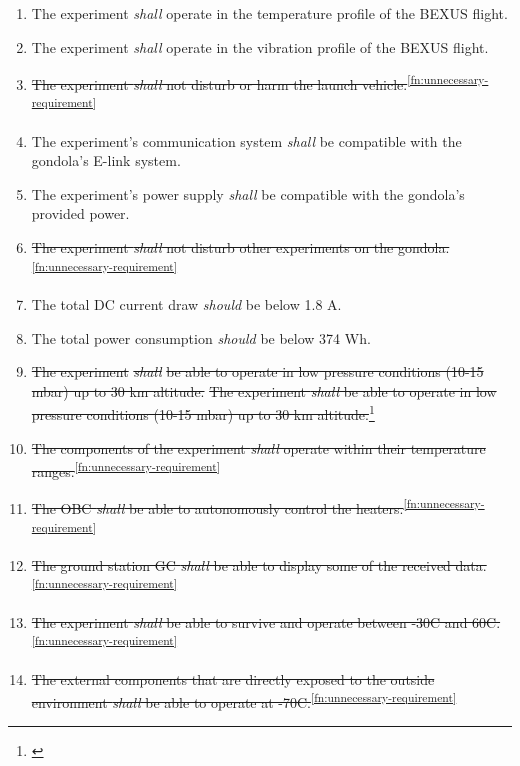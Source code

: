 \documentclass[a4paper,12pt,twoside, final]{article}
\providecommand{\DIFaddtex}[1]{{\protect\color{blue}\uwave{#1}}} %
\providecommand{\DIFdeltex}[1]{{\protect\color{red}\sout{#1}}}                      %
\providecommand{\DIFaddbegin}{} %
\providecommand{\DIFaddend}{} %
\providecommand{\DIFdelbegin}{} %
\providecommand{\DIFdelend}{} %
\providecommand{\DIFadd}[1]{\texorpdfstring{\DIFaddtex{#1}}{#1}} %
\providecommand{\DIFdel}[1]{\texorpdfstring{\DIFdeltex{#1}}{}} %
\newcommand{\DIFscaledelfig}{0.5}
\newlength{\DIFdelgraphicswidth} %
\newlength{\DIFdelgraphicsheight} %
\newcommand{\DIFaddincludegraphics}[2][]{{\color{blue}\fbox{\DIFOincludegraphics[#1]{#2}}}} %
\newcommand{\DIFdelincludegraphics}[2][]{%
\sbox{\DIFdelgraphicsbox}{\DIFOincludegraphics[#1]{#2}}%
\settoboxwidth{\DIFdelgraphicswidth}{\DIFdelgraphicsbox} %
\settoboxtotalheight{\DIFdelgraphicsheight}{\DIFdelgraphicsbox} %
\scalebox{\DIFscaledelfig}{%
\parbox[b]{\DIFdelgraphicswidth}{\usebox{\DIFdelgraphicsbox}\\[-\baselineskip] \rule{\DIFdelgraphicswidth}{0em}}\llap{\resizebox{\DIFdelgraphicswidth}{\DIFdelgraphicsheight}{%
\setlength{\unitlength}{\DIFdelgraphicswidth}%
\begin{picture}(1,1)%
\thicklines\linethickness{2pt} %
{\color[rgb]{1,0,0}\put(0,0){\framebox(1,1){}}}%
{\color[rgb]{1,0,0}\put(0,0){\line( 1,1){1}}}%
{\color[rgb]{1,0,0}\put(0,1){\line(1,-1){1}}}%
\end{picture}%
}\hspace*{3pt}}} %
} %
\DeclareRobustCommand{\DIFaddbegin}{\DIFOaddbegin \let\includegraphics\DIFaddincludegraphics} %
\DeclareRobustCommand{\DIFaddend}{\DIFOaddend \let\includegraphics\DIFOincludegraphics} %
\DeclareRobustCommand{\DIFdelbegin}{\DIFOdelbegin \let\includegraphics\DIFdelincludegraphics} %
\DeclareRobustCommand{\DIFdelend}{\DIFOaddend \let\includegraphics\DIFOincludegraphics} %
\begin{document}
\begin{enumerate}[label=D.\arabic*]
    \item The experiment \textit{shall} operate in the temperature profile of the BEXUS flight.
    \item The experiment \textit{shall} operate in the vibration profile of the BEXUS flight.
    \item \st{The experiment \textit{shall} not disturb or harm the launch vehicle.}\textsuperscript{\ref{fn:unnecessary-requirement}}
    \item The experiment's communication system \textit{shall} be compatible with the gondola's E-link system.
    \item The experiment's power supply \textit{shall} be compatible with the gondola's provided power.
    \item \st{The experiment \textit{shall} not disturb other experiments on the gondola.}\textsuperscript{\ref{fn:unnecessary-requirement}}
    \item The total DC current draw \textit{should} be below 1.8 A.
    \item The total power consumption \textit{should} be below 374 Wh.
    \item \DIFdelbegin \DIFdel{The experiment }\textit{\DIFdel{shall}} %
\DIFdel{be able to operate in low pressure conditions (10-15 mbar) up to 30 km altitude.
    }\DIFdelend \DIFaddbegin \st{The experiment \textit{shall} be able to operate in low pressure conditions (10-15 mbar) up to 30 km altitude.}\footnote{\DIFadd{Repeated in D18}\label{fn:repeat-d18}}
    \DIFaddend \item \st{The components of the experiment \textit{shall} operate within their temperature ranges.}\textsuperscript{\ref{fn:unnecessary-requirement}}
    \item \st{The OBC \textit{shall} be able to autonomously control the heaters.}\textsuperscript{\ref{fn:unnecessary-requirement}}
    \item \st{The ground station GC \textit{shall} be able to display some of the received data.}\textsuperscript{\ref{fn:unnecessary-requirement}}
    \item \st{The experiment \textit{shall} be able to survive and operate between -30\degree C and 60\degree C.}\textsuperscript{\ref{fn:unnecessary-requirement}}
    \item \st{The external components that are directly exposed to the outside environment \textit{shall} be able to operate at -70\degree C.}\textsuperscript{\ref{fn:unnecessary-requirement}}

\end{enumerate}
\end{document}
